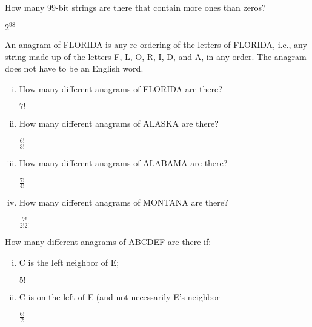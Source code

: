 \documentclass[11pt]{article}
\begin{document}
\begin{Parts}
    \Part How many 99-bit strings are there that contain more ones than zeros?
    \begin{Answer}
        $2^{98}$
    \end{Answer}
    
    \Part An anagram of FLORIDA is any re-ordering of the letters of FLORIDA, i.e., any string made up 
    of the letters F, L, O, R, I, D, and A, in any order. The anagram does not have to be an English word. 
    \begin{enumerate}[(i)]
        
        \item How many different anagrams of FLORIDA are there?
        \begin{Answer}
            $7!$
        \end{Answer}
        
        \item How many different anagrams of ALASKA are there?
        \begin{Answer}
            $\frac{6!}{3!}$
        \end{Answer}

        \item How many different anagrams of ALABAMA are there? 
        \begin{Answer}
            $\frac{7!}{4!}$
        \end{Answer}

        \item How many different anagrams of MONTANA are there?
        \begin{Answer}
            $\frac{7!}{2!2!}$
        \end{Answer}

    \end{enumerate}   
    
    \Part How many different anagrams of ABCDEF are there if: 
    \begin{enumerate}[(i)]
        
        \item C is the left neighbor of E; 
        \begin{Answer}
            $5!$
        \end{Answer}

        \item C is on the left of E (and not necessarily E's neighbor
        \begin{Answer}
            $\frac{6!}{2}$
        \end{Answer}


\end{enumerate}
\end{Parts}
\end{document}
